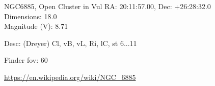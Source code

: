 \begin{block}{NGC6885, Open Cluster in Vul}
    RA: 20:11:57.00, Dec: +26:28:32.0 \\ 
    Dimensions: 18.0 \\ 
    Magnitude (V): 8.71

    Desc: (Dreyer) Cl, vB, vL, Ri, lC, st 6...11

    Finder fov: 60 

    \url{https://en.wikipedia.org/wiki/NGC_6885}
\end{block}
